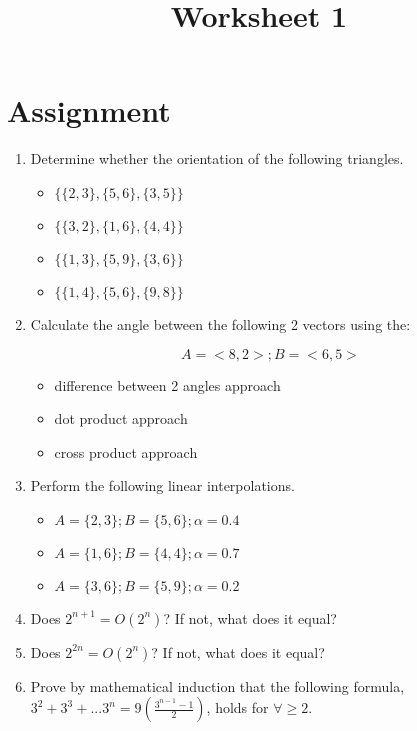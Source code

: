 \documentclass[a4paper,12pt]{article}
\title{Worksheet 1}
\begin{document}
\maketitle

\worksheetGroundRules


\vspace{5pt}
\section{Assignment}

\begin{enumerate}

\item Determine whether the orientation of the following triangles.


\begin{itemize}
\item $\{\{2,3\},\{5,6\},\{3,5\}\}$
\item $\{\{3,2\},\{1,6\},\{4,4\}\}$
\item $\{\{1,3\},\{5,9\},\{3,6\}\}$
\item $\{\{1,4\},\{5,6\},\{9,8\}\}$
\end{itemize}


\item Calculate the angle between the following 2 vectors using the:

$$A = <8,2>; B = <6,5>$$


\begin{itemize}
\item difference between 2 angles approach
\item dot product approach
\item cross product approach
\end{itemize}


\item Perform the following linear interpolations.

\begin{itemize}
\item $A=\{2,3\}; B=\{5,6\}; \alpha=0.4$
\item $A=\{1,6\}; B=\{4,4\}; \alpha=0.7$
\item $A=\{3,6\}; B=\{5,9\}; \alpha=0.2$
\end{itemize}


\item Does $2^{n+1}=O(2^n)$? If not, what does it equal?

\item Does $2^{2n}=O(2^n)$? If not, what does it equal?

\item Prove by mathematical induction that the following formula, $3^2+3^3+...3^n=9\left( \frac{3^{n-1}-1}{2} \right)$, holds for $\forall \geq 2$.


\end{enumerate}


\worksheetSubmission
\end{document}
